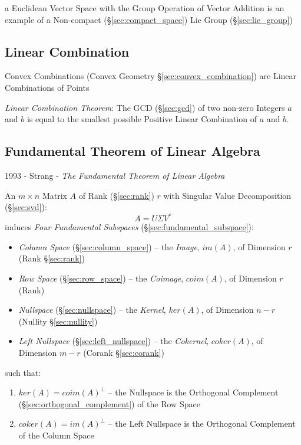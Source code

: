 a Euclidean Vector Space with the Group Operation of Vector Addition is an
example of a Non-compact (\S\ref{sec:compact_space}) Lie Group
(\S\ref{sec:lie_group})



\subsection{Linear Combination}\label{sec:linear_combination}

\fist Convex Combinations (Convex Geometry \S\ref{sec:convex_combination}) are
Linear Combinations of Points

\emph{Linear Combination Theorem}: The GCD (\S\ref{sec:gcd}) of two non-zero
Integers $a$ and $b$ is equal to the smallest possible Positive Linear
Combination of $a$ and $b$.



\subsection{Fundamental Theorem of Linear Algebra}
\label{sec:fundamental_linear_algebra_theorem}

1993 - Strang - \emph{The Fundamental Theorem of Linear Algebra}

An $m \times n$ Matrix $A$ of Rank (\S\ref{sec:rank}) $r$ with Singular
Value Decomposition (\S\ref{sec:svd}):
\[
  A = U \Sigma V^*
\]
induces \emph{Four Fundamental Subspaces} (\S\ref{sec:fundamental_subspace}):
\begin{itemize}
  \item \emph{Column Space} (\S\ref{sec:column_space}) -- the \emph{Image},
    $im(A)$, of Dimension $r$ (Rank \S\ref{sec:rank})
  \item \emph{Row Space} (\S\ref{sec:row_space}) -- the \emph{Coimage},
    $coim(A)$, of Dimension $r$ (Rank)
  \item \emph{Nullspace} (\S\ref{sec:nullspace}) -- the \emph{Kernel},
    $ker(A)$, of Dimension $n - r$ (Nullity \S\ref{sec:nullity})
  \item \emph{Left Nullspace} (\S\ref{sec:left_nullspace}) -- the
    \emph{Cokernel}, $coker(A)$, of Dimension $m - r$ (Corank
    \S\ref{sec:corank})
\end{itemize}
such that:
\begin{enumerate}
  \item $ker(A) = coim(A)^\bot$ -- the Nullspace is the Orthogonal Complement
    (\S\ref{sec:orthogonal_complement}) of the Row Space
  \item $coker(A) = im(A)^\bot$ -- the Left Nullspace is the Orthogonal
    Complement of the Column Space
\end{enumerate}



